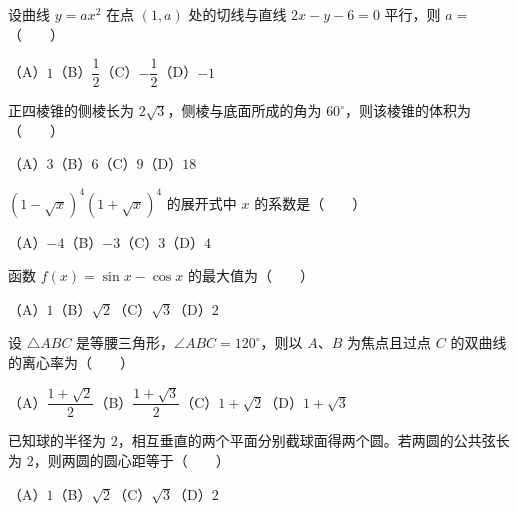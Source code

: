 \begin{question}
设曲线 $y=ax^2$ 在点 $(1,a)$ 处的切线与直线 $2x-y-6=0$ 平行，则 $a=$\mbox{（　　）}

（A）$1$\quad（B）$\dfrac12$\quad（C）$-\dfrac12$\quad（D）$-1$

\end{question}
\begin{question}
正四棱锥的侧棱长为 $2\sqrt3$，侧棱与底面所成的角为 $60^\circ$，则该棱锥的体积为\mbox{（　　）}

（A）$3$\quad（B）$6$\quad（C）$9$\quad（D）$18$

\end{question}
\begin{question}
$(1-\sqrt{x})^4(1+\sqrt{x})^4$ 的展开式中 $x$ 的系数是\mbox{（　　）}

（A）$-4$\quad（B）$-3$\quad（C）$3$\quad（D）$4$

\end{question}
\begin{question}
函数 $f(x)=\sin x-\cos x$ 的最大值为\mbox{（　　）}

（A）$1$\quad（B）$\sqrt2$\quad（C）$\sqrt3$\quad（D）$2$

\end{question}
\begin{question}
设 $\triangle ABC$ 是等腰三角形，$\angle ABC=120^\circ$，则以 $A\text{、}B$ 为焦点且过点 $C$ 的双曲线的离心率为\mbox{（　　）}

（A）$\dfrac{1+\sqrt2}{2}$\quad（B）$\dfrac{1+\sqrt3}{2}$\quad（C）$1+\sqrt2$\quad（D）$1+\sqrt3$

\end{question}
\begin{question}
已知球的半径为 $2$，相互垂直的两个平面分别截球面得两个圆。若两圆的公共弦长为 $2$，则两圆的圆心距等于\mbox{（　　）}

（A）$1$\quad（B）$\sqrt2$\quad（C）$\sqrt3$\quad（D）$2$

\end{question}

